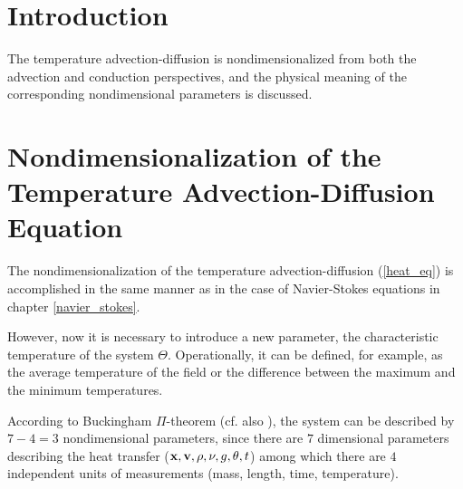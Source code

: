\providecommand{\partialTimeTemp}{\partial_t\theta}
\providecommand{\inertTermTemp}{(\velocity \cdot \nabla)\theta}
\providecommand{\tempGrad}{\nabla \theta}
\providecommand{\laplacianTemp}{\Delta\theta}


\providecommand{\divergenceNondim}{\nabla^{\prime}\cdot}

\providecommand{\velocityNondim}{\mathbf{v^{\prime}}}

\providecommand{\substDerivVelNondim}{\frac{D\velocity^{\prime}}{dt^{\prime}}}
\providecommand{\partialTimeVelNondim}{\partial_{t^{\prime}}\velocity^{\prime}}
\providecommand{\inertTermVelNondim}{(\velocity^{\prime} \cdot \nabla^{\prime})\velocity^{\prime}}

\providecommand{\velocityPressureTensorNondim}{\partial_k^{\prime}v^{l \prime}\partial_k^{\prime}v^{l \prime}}

\providecommand{\pressGradNondim}{\nabla^{\prime} p^{\prime}}
\providecommand{\pressLaplacianNondim}{\Delta^{\prime} p^{\prime}}
\providecommand{\laplacianVelNondim}{\Delta^{\prime}\velocity^{\prime}}


\section{Introduction}

The temperature advection-diffusion is nondimensionalized from both the advection and conduction perspectives, and the physical meaning of the corresponding nondimensional parameters is discussed. 

\section{Nondimensionalization of the Temperature Advection-Diffusion Equation}

The nondimensionalization of the temperature advection-diffusion (\ref{heat_eq}) is accomplished in the same manner as in the case of Navier-Stokes equations in chapter \ref{navier_stokes}. 

However, now it is necessary to introduce a new parameter, the characteristic temperature of the system $\Theta$. Operationally, it can be defined, for example, as the average temperature of the field or the difference between the maximum and the minimum temperatures.

According to Buckingham $\Pi$-theorem \cite{barenblatt1} (cf. also ), the system can be described by $7 - 4 = 3$ nondimensional parameters, since there are $7$ dimensional parameters describing the heat transfer ($\mathbf{x}, \mathbf{v}, \rho, \nu, g, \theta, t$) among which there are $4$ independent units of measurements (mass, length, time, temperature).

